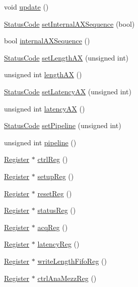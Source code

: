 \begin{DoxyCompactItemize}
void \hyperlink{classA3PE_a9e9b5ba5bd0ee19470c80761269a00f6}{update} ()
\item 
\hyperlink{classStatusCode}{StatusCode} \hyperlink{classA3PE_ad5f953a38661104a87834cc8a63252fa}{setInternalAXSequence} (bool)
\item 
bool \hyperlink{classA3PE_a4b9cf42bdd0a14e48807faa0956c59bd}{internalAXSequence} ()
\item 
\hyperlink{classStatusCode}{StatusCode} \hyperlink{classA3PE_a0300aa5c5ed02b82275c1de434196b9a}{setLengthAX} (unsigned int)
\item 
unsigned int \hyperlink{classA3PE_acb95104d817db2e4f97e250f7e45b43d}{lengthAX} ()
\item 
\hyperlink{classStatusCode}{StatusCode} \hyperlink{classA3PE_a53882e1272e8146e51837904ea00f33c}{setLatencyAX} (unsigned int)
\item 
unsigned int \hyperlink{classA3PE_ab5970721a8172ae57b3da68040f58199}{latencyAX} ()
\item 
\hyperlink{classStatusCode}{StatusCode} \hyperlink{classA3PE_a5b3840fc8edd14427ac9fb4def3171d3}{setPipeline} (unsigned int)
\item 
unsigned int \hyperlink{classA3PE_aeb22b2fcba4d14f234ad2d6dcef7948c}{pipeline} ()
\item 
\hyperlink{classRegister}{Register} $\ast$ \hyperlink{classA3PE_ae5fc5dac92af2b34a41be388586647be}{ctrlReg} ()
\item 
\hyperlink{classRegister}{Register} $\ast$ \hyperlink{classA3PE_a94d96383e441153ed01e82cc12d2f593}{setupReg} ()
\item 
\hyperlink{classRegister}{Register} $\ast$ \hyperlink{classA3PE_afd34bfbfd92838717c7cdec856b2a0b2}{resetReg} ()
\item 
\hyperlink{classRegister}{Register} $\ast$ \hyperlink{classA3PE_af260fc8bce78935b7bad57c987574683}{statusReg} ()
\item 
\hyperlink{classRegister}{Register} $\ast$ \hyperlink{classA3PE_aca56dadafd70e670e75569ee03d91651}{acqReg} ()
\item 
\hyperlink{classRegister}{Register} $\ast$ \hyperlink{classA3PE_a42dad20d5a1482431e73c64250b76185}{latencyReg} ()
\item 
\hyperlink{classRegister}{Register} $\ast$ \hyperlink{classA3PE_a3b75531731fc939206cce076f7ac9f9a}{writeLengthFifoReg} ()
\item 
\hyperlink{classRegister}{Register} $\ast$ \hyperlink{classA3PE_aa94c6120a73194d69dc5761cf90a4800}{ctrlAnaMezzReg} ()
\item 

\end{DoxyCompactItemize}
